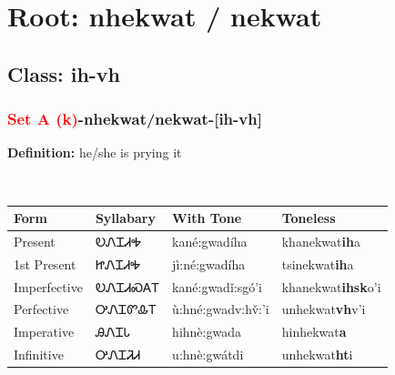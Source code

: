 \needspace{4in}
\section*{Root: nhekwat / nekwat}
\nopagebreak
{}
\needspace{3in}
\subsection*{Class: ih-vh}
\nopagebreak
\needspace{2in}
\subsubsection*{\textcolor{Red}{Set A (k)}{-}\textbf{nhekwat/nekwat}{-}[ih-vh]}
\nopagebreak
\textbf{Definition: } he/she is prying it
\\[0.5em]
\begin{tabularx}{\textwidth}{l X X X}%
\toprule%
\textbf{Form}&\textbf{Syllabary}&\textbf{With Tone}&\textbf{Toneless}\\%
\midrule%
Present&ᎧᏁᏆᏗᎭ&kané:gwadíha&khanekwat\textbf{ih}a\\%
1st Present&ᏥᏁᏆᏗᎭ&jì:né:gwadíha&tsinekwat\textbf{ih}a\\%
Imperfective&ᎧᏁᏆᏗᏍᎪᎢ&kané:gwadǐ:sgó’i&khanekwat\textbf{ihsk}o'i\\%
Perfective&ᎤᏁᏆᏛᎲᎢ&ù:hné:gwadv:hv̌:’i&unhekwat\textbf{vh}v'i\\%
Imperative&ᎯᏁᏆᏓ&hihnè:gwada&hinhekwat\textbf{a}\\%
Infinitive&ᎤᏁᏆᏘᏗ&u:hnè:gwátdi&unhekwat\textbf{ht}i\\%
\bottomrule%
\end{tabularx}
\\[1em]